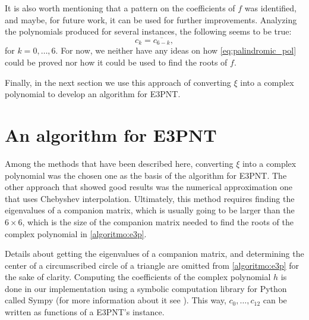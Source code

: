It is also worth mentioning that a pattern on the coefficients of $f$ was identified, and maybe, for future work, it can be used for further improvements. Analyzing the polynomials produced for several instances, the following seems to be true:
\begin{equation}\label{eq:palindromic_pol}
c_k = \overline{c_{6-k}},
\end{equation}
for $k=0, \dots, 6$. For now, we neither have any ideas on how \autoref{eq:palindromic_pol} could be proved nor how it could be used to find the roots of $f$.

Finally, in the next section we use this approach of converting $\xi$ into a complex polynomial to develop an algorithm for E3PNT.

\section{An algorithm for E3PNT}

Among the methods that have been described here, converting $\xi$ into a complex polynomial was the chosen one as the basis of the algorithm for E3PNT.
The other approach that showed good results was the numerical approximation one that uses Chebyshev interpolation. Ultimately, this method requires finding the eigenvalues of a companion matrix, which is usually going to be larger than the $6\times 6$, which is the size of the companion matrix needed to find the roots of the complex polynomial in \autoref{algoritmo:e3p}. 

Details about getting the eigenvalues of a companion matrix, and determining the center of a circumscribed circle of a triangle are omitted from \autoref{algoritmo:e3p} for the sake of clarity. 
Computing the coefficients of the complex polynomial $h$ is done in our implementation using a symbolic computation library for Python called Sympy (for more information about it see ). This way, $c_0, \dots, c_{12}$ can be written as functions of a E3PNT's instance.


